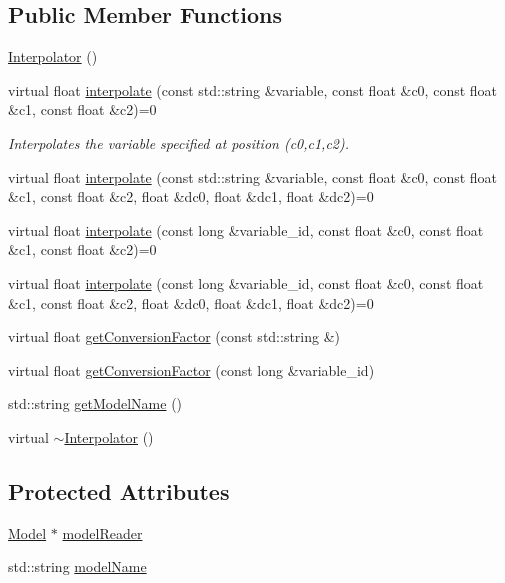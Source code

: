 \subsection*{Public Member Functions}
\begin{DoxyCompactItemize}
\item 
\hyperlink{classccmc_1_1_interpolator_aad045da9084b7ecb248f336502c643e5}{Interpolator} ()
\item 
virtual float \hyperlink{classccmc_1_1_interpolator_ad5c1dd3693f83d75a2335b7c28cd649d}{interpolate} (const std\-::string \&variable, const float \&c0, const float \&c1, const float \&c2)=0
\begin{DoxyCompactList}\small\item\em Interpolates the variable specified at position (c0,c1,c2). \end{DoxyCompactList}\item 
virtual float \hyperlink{classccmc_1_1_interpolator_ae02453da5a1a8f472f33b2058424ddb6}{interpolate} (const std\-::string \&variable, const float \&c0, const float \&c1, const float \&c2, float \&dc0, float \&dc1, float \&dc2)=0
\item 
virtual float \hyperlink{classccmc_1_1_interpolator_a6bfe1b4075f03704b893bb96e1675a3b}{interpolate} (const long \&variable\-\_\-id, const float \&c0, const float \&c1, const float \&c2)=0
\item 
virtual float \hyperlink{classccmc_1_1_interpolator_aa6b272bd53630020d92938ec1e5cfad9}{interpolate} (const long \&variable\-\_\-id, const float \&c0, const float \&c1, const float \&c2, float \&dc0, float \&dc1, float \&dc2)=0
\item 
virtual float \hyperlink{classccmc_1_1_interpolator_aa34cdc52236e6f143032340907dfa403}{get\-Conversion\-Factor} (const std\-::string \&)
\item 
virtual float \hyperlink{classccmc_1_1_interpolator_ab5d482c6e07c9fe00d01061b414ebd66}{get\-Conversion\-Factor} (const long \&variable\-\_\-id)
\item 
std\-::string \hyperlink{classccmc_1_1_interpolator_ad35acb724fffeea5794a0c6e2a10f7a9}{get\-Model\-Name} ()
\item 
virtual \hyperlink{classccmc_1_1_interpolator_a6f36d0af2bd233263435f5864713be4c}{$\sim$\-Interpolator} ()
\end{DoxyCompactItemize}
\subsection*{Protected Attributes}
\begin{DoxyCompactItemize}
\item 
\hyperlink{classccmc_1_1_model}{Model} $\ast$ \hyperlink{classccmc_1_1_interpolator_afee5bb61e5d5a0a7b9152c6f74378c4a}{model\-Reader}
\item 
std\-::string \hyperlink{classccmc_1_1_interpolator_a7b86407984c4ce59643b926064bdb364}{model\-Name}
\end{DoxyCompactItemize}


